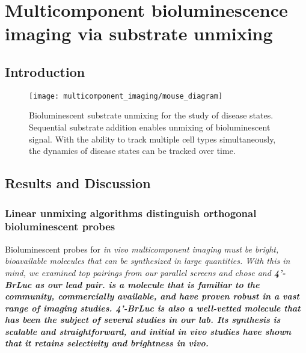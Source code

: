 
\chapter{Multicomponent bioluminescence imaging via substrate unmixing}
\section{Introduction}

\begin{figure}[htbp]
\texttt{[image: multicomponent\_imaging/mouse\_diagram]}
\centering
\caption[Bioluminescent substrate unmixing for the study of disease states]{
Bioluminescent substrate unmixing for the study of disease states. Sequential substrate addition enables unmixing of bioluminescent signal. With the ability to track multiple cell types simultaneously, the dynamics of disease states can be tracked over time.
}
  \label{fig:mouse_diagram}
\end{figure}


\section{Results and Discussion}
\subsection{Linear unmixing algorithms distinguish orthogonal bioluminescent probes}
Bioluminescent probes for \it{in vivo} multicomponent imaging must be bright, bioavailable molecules that can be synthesized in large quantities. With this in mind, we examined top pairings from our parallel screens\cite{RathbunParallelScreeningRapid2017} and chose \dluc{} and \bf{4'-BrLuc} as our lead pair.
\dluciferin{} is a molecule that is familiar to the community, commercially available, and have proven robust in a vast range of imaging studies.\cite{PaleyBioluminescenceversatiletechnique2014}
\bf{4'-BrLuc} is also a well-vetted molecule that has been the subject of several studies in our lab. Its synthesis is scalable and straightforward,\cite{SteinhardtBrominatedLuciferinsAre2016} and initial \it{in vivo} studies have shown that it retains selectivity and brightness \it{in vivo.}\cite{RathbunParallelScreeningRapid2017}

